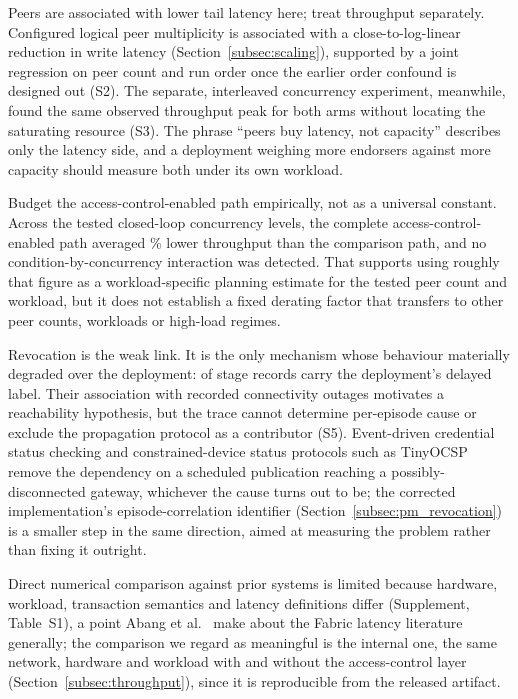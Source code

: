 \documentclass[a4paper,fleqn]{cas-sc}
\begin{document}
Peers are associated with lower tail latency here; treat throughput
separately. Configured logical peer multiplicity is associated with a
close-to-log-linear reduction in write latency (Section~\ref{subsec:scaling}),
supported by a joint regression on peer count and run order once the
earlier order confound is designed out (S2). The separate, interleaved
concurrency experiment, meanwhile, found the same observed throughput peak
for both arms without locating the saturating resource (S3). The phrase
``peers buy latency, not capacity'' describes only the latency side, and a
deployment weighing more endorsers against more capacity should measure
both under its own workload.

Budget the access-control-enabled path empirically, not as a universal
constant. Across the tested closed-loop concurrency levels, the complete
access-control-enabled path averaged \OverheadMeanPct\% lower throughput
than the comparison path, and no condition-by-concurrency interaction was
detected. That supports using roughly that figure as a workload-specific
planning estimate for the tested peer count and workload, but it does not
establish a fixed derating factor that transfers to other peer counts,
workloads or high-load regimes.

Revocation is the weak link. It is the only mechanism whose behaviour
materially degraded over the deployment: \RevDelayed{} of \RevEvents{}
stage records carry the deployment's delayed label. Their association with
recorded connectivity outages motivates a reachability hypothesis, but the
trace cannot determine per-episode cause or exclude the propagation
protocol as a contributor (S5). Event-driven credential status checking
\cite{w3c_vc_status_list} and constrained-device status protocols such as
TinyOCSP \cite{fedrecheski2023tinyocsp} remove the dependency on a
scheduled publication reaching a possibly-disconnected gateway, whichever
the cause turns out to be; the corrected implementation's episode-correlation identifier
(Section~\ref{subsec:pm_revocation}) is a smaller step in the same
direction, aimed at measuring the problem rather than fixing it outright.

Direct numerical comparison against prior systems is limited because
hardware, workload, transaction semantics and latency definitions differ
(Supplement, Table~S1), a point
Abang et al.~\cite{abang2024latency} make about the Fabric latency
literature generally; the comparison we regard as meaningful is the
internal one, the same network, hardware and workload with and without
the access-control layer (Section~\ref{subsec:throughput}), since it is
reproducible from the released artifact.
\end{document}
